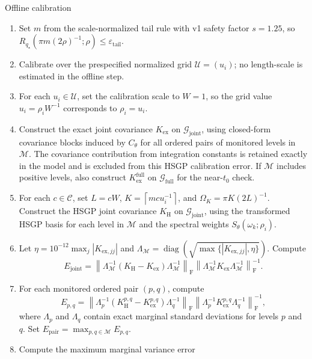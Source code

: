 \documentclass[11pt,a4paper]{article}
\theoremstyle{definition}
\theoremstyle{remark}
\DeclareMathOperator{\diag}{diag}
\newcommand{\norm}[1]{\left\lVert #1 \right\rVert}
\begin{document}
\begin{tartarebox}{Offline calibration}
\small
\begin{enumerate}[label=\textbf{O\arabic*.},leftmargin=1.8em,itemsep=4pt,topsep=2pt]
\item Set \(m\) from the scale-normalized tail rule with v1 safety factor \(s=1.25\), so \(R_{q_\star}\!\left(\pi m(2\rho)^{-1};\rho\right)\leq \varepsilon_{\mathrm{tail}}\).
\item Calibrate over the prespecified normalized grid \(\mathcal U=(u_i)\); no length-scale is estimated in the offline step.
\item For each \(u_i\in\mathcal U\), set the calibration scale to \(W=1\), so the grid value \(u_i=\rho_iW^{-1}\) corresponds to \(\rho_i=u_i\).
\item Construct the exact joint covariance \(K_{\mathrm{ex}}\) on \(\mathcal G_{\mathrm{joint}}\), using closed-form covariance blocks induced by \(C_\theta\) for all ordered pairs of monitored levels in \(\mathcal M\). The covariance contribution from integration constants is retained exactly in the model and is excluded from this HSGP calibration error. If \(\mathcal M\) includes positive levels, also construct \(K_{\mathrm{ex}}^{\mathrm{full}}\) on \(\mathcal G_{\mathrm{full}}\) for the near-\(t_0\) check.
\item For each \(c\in\mathcal C\), set \(L=cW\), \(K=\left\lceil mcu_i^{-1}\right\rceil\), and \(\Omega_K=\pi K(2L)^{-1}\). Construct the HSGP joint covariance \(K_{\mathrm H}\) on \(\mathcal G_{\mathrm{joint}}\), using the transformed HSGP basis for each level in \(\mathcal M\) and the spectral weights \(S_\theta(\omega_k;\rho_i)\).
\item Let \(\eta=10^{-12}\max_j|K_{\mathrm{ex},jj}|\) and \(\Lambda_{\mathcal M}=\diag\left(\sqrt{\max\{|K_{\mathrm{ex},jj}|,\eta\}}\right)\). Compute
\[
E_{\mathrm{joint}}=\norm{\Lambda_{\mathcal M}^{-1}(K_{\mathrm H}-K_{\mathrm{ex}})\Lambda_{\mathcal M}^{-1}}_{\mathrm F}\norm{\Lambda_{\mathcal M}^{-1}K_{\mathrm{ex}}\Lambda_{\mathcal M}^{-1}}_{\mathrm F}^{-1}.
\]
\item For each monitored ordered pair \((p,q)\), compute
\[
E_{p,q}=\norm{\Lambda_p^{-1}(K_{\mathrm H}^{p,q}-K_{\mathrm{ex}}^{p,q})\Lambda_q^{-1}}_{\mathrm F}\norm{\Lambda_p^{-1}K_{\mathrm{ex}}^{p,q}\Lambda_q^{-1}}_{\mathrm F}^{-1},
\]
where \(\Lambda_p\) and \(\Lambda_q\) contain exact marginal standard deviations for levels \(p\) and \(q\). Set \(E_{\mathrm{pair}}=\max_{p,q\in\mathcal M}E_{p,q}\).
\item Compute the maximum marginal variance error

\end{enumerate}
\end{tartarebox}
\end{document}
